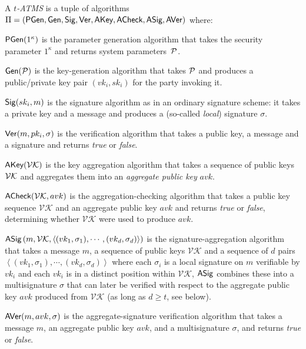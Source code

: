 \begin{definition}
  A \textit{$t$-ATMS} is a tuple of algorithms
  $\Pi = (
    \textsf{PGen},
    \mathsf{Gen},
    \mathsf{Sig},
    \mathsf{Ver},
    \textsf{AKey},
    \textsf{ACheck},
    \textsf{ASig},
    \textsf{AVer}
  )$
  where:
  \begin{description}
  \item $\textsf{PGen}(1^\kappa)$
     is the parameter generation algorithm that takes the security parameter
     $1^\kappa$ and returns system parameters~$\mathcal{P}$.
   \item $\mathsf{Gen}(\mathcal{P})$
     is the key-generation algorithm that takes $\mathcal{P}$ and produces a
     public/private key pair $(vk_i, sk_i)$ for the party invoking it.
   \item $\mathsf{Sig}(sk_i,m)$
    is the signature algorithm as in an ordinary signature scheme: it takes a private
    key and a message and produces a (so-called \emph{local}) signature $\sigma$.
   \item $\mathsf{Ver}(m, pk_i, \sigma)$
    is the verification algorithm that takes a public key, a message and a
    signature and returns \emph{true} or \emph{false}.
   \item $\textsf{AKey}(\mathcal{VK})$
    is the key aggregation algorithm that takes a sequence of public keys $\mathcal{VK}$
    and aggregates them into an \emph{aggregate public key} $avk$.
  \item $\textsf{ACheck}(\mathcal{VK},avk)$
    is the aggregation-checking algorithm that takes a public key sequence
    $\mathcal{VK}$ and an aggregate public key $avk$ and returns \emph{true} or
    \emph{false}, determining whether $\mathcal{VK}$ were used to produce $avk$.
  \item $\textsf{ASig}\left(m,\mathcal{VK},\left<(vk_1,\sigma_1),\cdots, (vk_d, \sigma_d)\right>\right)$
    is the signature-aggregation algorithm that takes a message $m$, a sequence of
    public keys $\mathcal{VK}$ and a sequence of $d$ pairs $\left<(vk_1,\sigma_1), \cdots, (vk_d, \sigma_d)\right>$
    where each $\sigma_i$ is a local signature on $m$ verifiable by $vk_i$ and
    each $vk_i$ is in a distinct position within $\mathcal{VK}$, $\textsf{ASig}$
    combines these into a multisignature $\sigma$ that can later be verified with
    respect to the aggregate public key $avk$ produced from $\mathcal{VK}$ (as
    long as $d \geq t$, see below).
  \item $\textsf{AVer}(m,avk,\sigma)$
    is the aggregate-signature verification algorithm that takes
    a message $m$, an aggregate public key $avk$, and a multisignature $\sigma$,
    and returns \emph{true} or \emph{false}.
  \end{description}
\end{definition}

